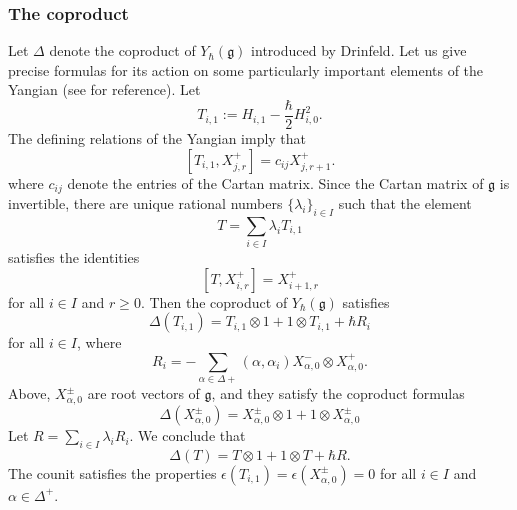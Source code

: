 \documentclass{amsart}
\def\fg{{\mathfrak{g}}}
\begin{document}
\medskip 

\subsubsection{The coproduct} Let $\Delta$ denote the coproduct of $Y_{\hbar}(\fg)$ introduced by Drinfeld. Let us give precise formulas for its action on some particularly important elements of the Yangian (see \cite{Lev2} for reference). Let 
\[
T_{i,1}:= H_{i,1}- \frac{\hbar}{2} H^2_{i,0} .
\] 
The defining relations of the Yangian imply that 
\[ 
[T_{i,1},X^+_{j,r}]=c_{ij} X^+_{j,r+1}.
\] 
where $c_{ij}$ denote the entries of the Cartan matrix. Since the Cartan matrix of $\fg$ is invertible, there are unique rational numbers $\{\lambda_i\}_{i \in I}$ such that the element 
\begin{equation}
\label{eqn:t}
T = \sum_{i \in I} \lambda_i T_{i,1}
\end{equation}
satisfies the identities 
\begin{equation}
\label{eqn:ad t}
[T,X^+_{i,r}]=X^+_{i+1,r}
\end{equation}
for all $i\in I$ and $r \geq 0$. Then the coproduct of $Y_{\hbar}(\fg)$ satisfies
\begin{equation}
\label{eqn:cop ti}
\Delta(T_{i,1})= T_{i,1} \otimes 1 + 1 \otimes T_{i,1} + \hbar  R_i
\end{equation}
for all $i \in I$, where 
\begin{equation}
\label{eqn:r matrix}
R_i = - \sum_{\alpha \in \Delta+} (\alpha,\alpha_i) X^-_{\alpha,0} \otimes X^+_{\alpha,0}. 
\end{equation}
Above, $X_{\alpha,0}^\pm$ are root vectors of $\fg$, and they satisfy the coproduct formulas 
\begin{equation}
\label{eqn:cop x}
\Delta(X^{\pm}_{\alpha,0}) = X^{\pm}_{\alpha,0} \otimes 1+ 1 \otimes X^{\pm}_{\alpha,0} 
\end{equation}
Let $R = \sum_{i \in I} \lambda_i R_i$. We conclude that
\begin{equation}
\label{eqn:cop t}
\Delta(T) = T \otimes 1+ 1 \otimes T + \hbar R.
\end{equation}
The counit satisfies the properties $\epsilon(T_{i,1})=\epsilon(X^{\pm}_{\alpha,0})=0$ for all $i \in I$ and $\alpha \in \Delta^+$. 

\medskip 
\end{document}
